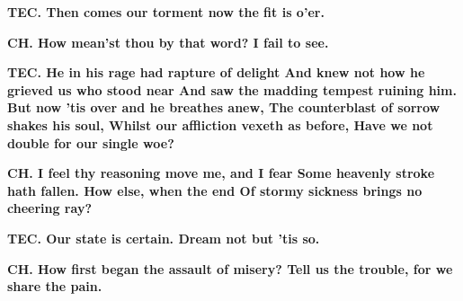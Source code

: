 \documentclass[11pt,letter]{book}
\begin{document}
\par \textbf{TEC. Then comes our torment now the fit is o’er.}
\par 

\par \textbf{CH. How mean’st thou by that word? I fail to see.}
\par 

\par \textbf{TEC. He in his rage had rapture of delight And knew not how he grieved us who stood near And saw the madding tempest ruining him. But now ’tis over and he breathes anew, The counterblast of sorrow shakes his soul, Whilst our affliction vexeth as before, Have we not double for our single woe?}
\par 

\par \textbf{CH. I feel thy reasoning move me, and I fear Some heavenly stroke hath fallen. How else, when the end Of stormy sickness brings no cheering ray?}
\par 

\par \textbf{TEC. Our state is certain. Dream not but ’tis so.}
\par 

\par \textbf{CH. How first began the assault of misery? Tell us the trouble, for we share the pain.}
\par 
\end{document}
